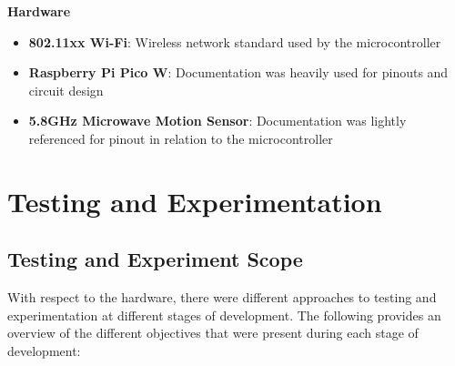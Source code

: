 \documentclass[conference]{IEEEtran}
\begin{document}
\textbf{Hardware}
\begin{itemize}
      \item \textbf{802.11xx Wi-Fi}: Wireless network standard used by the
            microcontroller
      \item \textbf{Raspberry Pi Pico W}: Documentation was heavily used for pinouts
            and circuit design \cite{picoW_docs2016}
      \item \textbf{5.8GHz Microwave Motion Sensor}: Documentation was lightly
            referenced for pinout in relation to the microcontroller \cite{CQRobot_specs2016}
\end{itemize}

\section{Testing and Experimentation}\label{sec:testing-and-experimentation}

\subsection{Testing and Experiment Scope}\label{subsec:testing-and-experiment-scope}

With respect to the hardware, there were different approaches
to testing and experimentation
at different stages of development.
The following provides an overview of the different objectives that were present during each stage of development:
\end{document}
